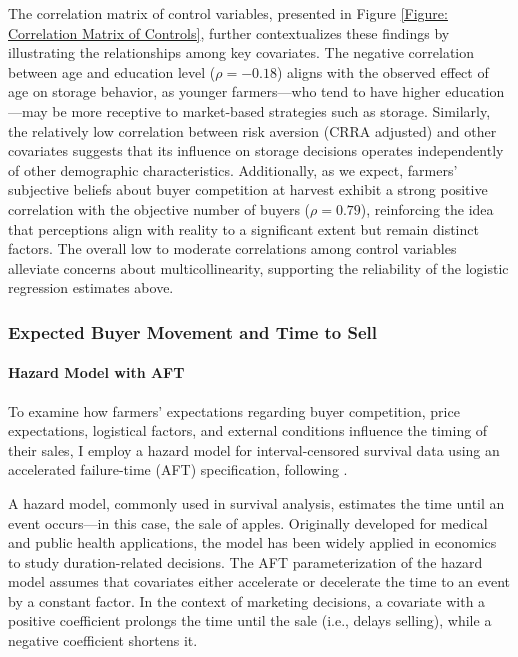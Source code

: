 \documentclass[12pt]{article}
\begin{document}
The correlation matrix of control variables, presented in Figure \ref{Figure: Correlation Matrix of Controls}, further contextualizes these findings by illustrating the relationships among key covariates. The negative correlation between age and education level ($\rho = -0.18$) aligns with the observed effect of age on storage behavior, as younger farmers—who tend to have higher education—may be more receptive to market-based strategies such as storage. Similarly, the relatively low correlation between risk aversion (CRRA adjusted) and other covariates suggests that its influence on storage decisions operates independently of other demographic characteristics. Additionally, as we expect, farmers’ subjective beliefs about buyer competition at harvest exhibit a strong positive correlation with the objective number of buyers ($\rho = 0.79$), reinforcing the idea that perceptions align with reality to a significant extent but remain distinct factors. The overall low to moderate correlations among control variables alleviate concerns about multicollinearity, supporting the reliability of the logistic regression estimates above. 


\newpage
\subsubsection{Expected Buyer Movement and Time to Sell}

\paragraph{Hazard Model with AFT}

To examine how farmers' expectations regarding buyer competition, price expectations, logistical factors, and external conditions influence the timing of their sales, I employ a hazard model for interval-censored survival data using an accelerated failure-time (AFT) specification, following \cite{albuquerque2024market}.  

A hazard model, commonly used in survival analysis, estimates the time until an event occurs—in this case, the sale of apples. Originally developed for medical and public health applications, the model has been widely applied in economics to study duration-related decisions. The AFT parameterization of the hazard model assumes that covariates either accelerate or decelerate the time to an event by a constant factor. In the context of marketing decisions, a covariate with a positive coefficient prolongs the time until the sale (i.e., delays selling), while a negative coefficient shortens it.  
\end{document}

